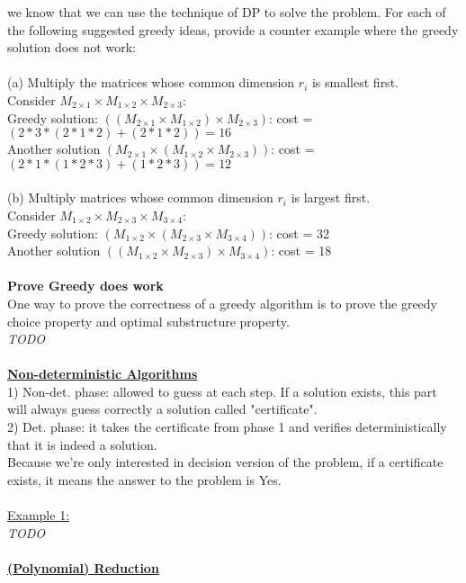 \documentclass[8pt,letterpaper,twocolumn]{article}
\begin{document}
we know that we can use the technique of DP to solve the problem. For each of the following suggested greedy ideas,
provide a counter example where the greedy solution does not work:\\
\\
(a) Multiply the matrices whose common dimension $r_i$ is smallest first.\\
Consider $M_{2\times1} \times M_{1\times2} \times M_{2\times3}$:\\
\textbullet Greedy solution: $((M_{2\times1} \times M_{1\times2}) \times M_{2\times3})$: cost = $(2*3*(2*1*2)+(2*1*2))=16$\\
\textbullet Another solution $(M_{2\times1} \times (M_{1\times2} \times M_{2\times3}))$: cost = $(2*1*(1*2*3)+(1*2*3))=12$\\
\\
(b) Multiply matrices whose common dimension $r_i$ is largest first.\\
Consider $M_{1\times2} \times M_{2\times3} \times M_{3\times4}$:\\
\textbullet Greedy solution: $(M_{1\times2} \times (M_{2\times3} \times M_{3\times4}))$: cost = 32\\
\textbullet Another solution $((M_{1\times2} \times M_{2\times3}) \times M_{3\times4})$: cost = 18\\
\\
\textbf{Prove Greedy does work}\\
One way to prove the correctness of a greedy algorithm is to prove the greedy choice property and optimal substructure property.\\
\emph{TODO}\\
\\
\underline{\textbf{Non-deterministic Algorithms}}\\
1) Non-det. phase: allowed to guess at each step. If a solution exists, this part will always guess correctly a solution called "certificate".\\
2) Det. phase: it takes the certificate from phase 1 and verifies deterministically that it is indeed a solution.\\
Because we're only interested in decision version of the problem, if a certificate exists, it means the answer to the problem is Yes.\\
\\
\underline{Example 1:}\\
\emph{TODO}\\
\\
\underline{\textbf{(Polynomial) Reduction}}\\
\end{document}
